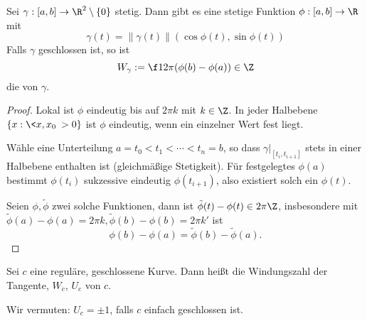 \begin{lem}
	Sei $\gamma: [a,b] \to \R^2 \setminus \{0\}$ stetig.
	Dann gibt es eine stetige Funktion $\phi: [a,b] \to \R$ mit
	\[
		\gamma(t) = \| \gamma(t) \| (\cos \phi(t), \sin \phi(t))
	\]
	Falls $\gamma$ geschlossen ist, so ist
	\[
		W_\gamma := \f 1{2\pi} (\phi(b) - \phi(a)) \in \Z
	\]
	die  von $\gamma$.
	\begin{proof}
		Lokal ist $\phi$ eindeutig bis auf $2\pi k$ mit $k \in \Z$.
		In jeder Halbebene $\{ x : \<x, x_0\> > 0 \}$ ist $\phi$ eindeutig, wenn ein einzelner Wert fest liegt.

		Wähle eine Unterteilung $a = t_0 < t_1 < \dotsb < t_n = b$, so dass $\gamma|_{[t_i, t_{i+1}]}$ stets in einer Halbebene enthalten ist (gleichmäßige Stetigkeit).
		Für festgelegtes $\phi(a)$ bestimmt $\phi(t_{i})$ sukzessive eindeutig $\phi(t_{i+1})$, also existiert solch ein $\phi(t)$.

		Seien $\phi, \tilde \phi$ zwei solche Funktionen, dann ist $\tilde \phi(t) - \phi(t) \in 2\pi\Z$, insbesondere mit $\tilde \phi(a) - \phi(a) = 2\pi k, \tilde \phi(b) - \phi(b) = 2 \pi k'$ ist
		\[
			\phi(b) - \phi(a) = \tilde \phi(b) - \tilde \phi(a).
		\]
	\end{proof}
\end{lem}

\begin{df}
	Sei $c$ eine reguläre, geschlossene Kurve.
	Dann heißt die Windungszahl der Tangente, $W_{\dot c}$,  $U_c$ von $c$.
\end{df}

Wir vermuten: $U_c = \pm 1$, falls $c$ einfach geschlossen ist.

